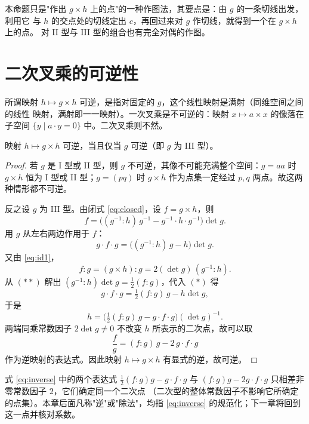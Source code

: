 \begin{remark}
本命题只是"作出 $g\times h$ 上的点"的一种作图法，其要点是：由 $g$ 的一条切线出发，利用它
与 $h$ 的交点处的切线定出 $c$，再回过来对 $g$ 作切线，就得到一个在 $g\times h$ 上的点。
对 II 型与 III 型的组合也有完全对偶的作图。
\end{remark}

\section{二次叉乘的可逆性}

所谓映射 $h\mapsto g\times h$ 可逆，是指对固定的 $g$，这个线性映射是满射（同维空间之间的线性
映射，满射即一一映射）。一次叉乘是不可逆的：映射 $x\mapsto a\times x$ 的像落在子空间
$\{y\mid a\cdot y=0\}$ 中。二次叉乘则不然。

\begin{proposition}
\label{prop:invertible}
映射 $h\mapsto g\times h$ 可逆，当且仅当 $g$ 可逆（即 $g$ 为 III 型）。
\end{proposition}

\begin{proof}
若 $g$ 是 I 型或 II 型，则 $g$ 不可逆，其像不可能充满整个空间：$g=aa$ 时 $g\times h$ 恒为
I 型或 II 型；$g=(pq)$ 时 $g\times h$ 作为点集一定经过 $p,q$ 两点。故这两种情形都不可逆。

反之设 $g$ 为 III 型。由闭式 \eqref{eq:closed}，设 $f=g\times h$，则
\[
f=\big((g^{-1}:h)\,g^{-1}-g^{-1}\cdot h\cdot g^{-1}\big)\det g .
\]
用 $g$ 从左右两边作用于 $f$：
\[
g\cdot f\cdot g=\big((g^{-1}:h)\,g-h\big)\det g . \tag{$\ast$}
\]
又由 \eqref{eq:id1}，
\[
f:g=(g\times h):g=2(\det g)\,(g^{-1}:h). \tag{$\ast\ast$}
\]
从 $(\ast\ast)$ 解出 $(g^{-1}:h)\det g=\tfrac12(f:g)$，代入 $(\ast)$ 得
\[
g\cdot f\cdot g=\tfrac12(f:g)\,g-h\det g ,
\]
于是
\[
h=\Big(\tfrac12(f:g)\,g-g\cdot f\cdot g\Big)(\det g)^{-1}.
\]
两端同乘常数因子 $2\det g\ne0$ 不改变 $h$ 所表示的二次点，故可以取
\begin{equation}
\label{eq:inverse}
\frac fg=(f:g)\,g-2\,g\cdot f\cdot g
\end{equation}
作为逆映射的表达式。因此映射 $h\mapsto g\times h$ 有显式的逆，故可逆。
\end{proof}

\begin{remark}
式 \eqref{eq:inverse} 中的两个表达式 $\frac12(f:g)g-g\cdot f\cdot g$ 与
$(f:g)g-2g\cdot f\cdot g$ 只相差非零常数因子 $2$，它们确定同一个二次点
（二次型的整体常数因子不影响它所确定的点集）。本章后面凡称"逆"或"除法"，均指
\eqref{eq:inverse} 的规范化；下一章将回到这一点并核对系数。
\end{remark}

